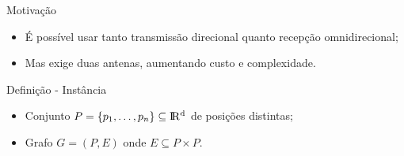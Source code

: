 \begin{frame}{Motivação}
  \begin{itemize}[<+->]

    \item É possível usar tanto transmissão direcional quanto recepção omnidirecional;

    \item Mas exige duas antenas, aumentando custo e complexidade.

  \end{itemize}
\end{frame}

\begin{frame}{Definição - Instância}
  \begin{itemize}[<+->]

    \item Conjunto $P = \{p_1, \dots, p_n\}\subseteq \rm I\!R^d$ de posições distintas;

    \item Grafo $G=(P, E)$ onde $E\subseteq P\times P$.

  \end{itemize}
\end{frame}

